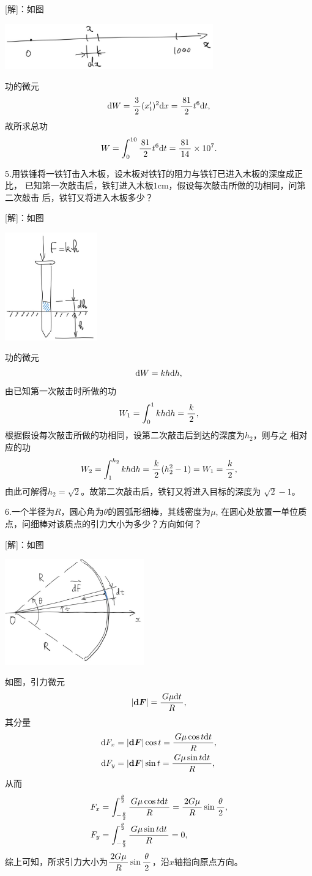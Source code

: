 [解]：如图
\begin{center}
	\includegraphics[width=9cm]{./images/ch6/moveSt.jpg}
\end{center}
功的微元
$$\d W=\df32(x'_t)^2\d x=\df{81}2t^6\d t,$$
故所求总功
$$W=\dint_0^{10}\df{81}2t^6\d t=\df{81}{14}\times10^7.$$
\fin

5.用铁锤将一铁钉击入木板，设木板对铁钉的阻力与铁钉已进入木板的深度成正比，
已知第一次敲击后，铁钉进入木板$1$cm，假设每次敲击所做的功相同，问第二次敲击
后，铁钉又将进入木板多少？

[解]：如图
\begin{center}
	\includegraphics[width=4cm]{./images/ch6/nailSt.jpg}
\end{center}
功的微元
$$\d W=kh\d h,$$
由已知第一次敲击时所做的功
$$W_1=\dint_0^1kh\d h=\df k2,$$
根据假设每次敲击所做的功相同，设第二次敲击后到达的深度为$h_2$，则与之
相对应的功
$$W_2=\dint_1^{h_2}kh\d h=\df k2(h^2_2-1)=W_1=\df k2,$$
由此可解得$h_2=\sqrt2$。故第二次敲击后，铁钉又将进入目标的深度为
$\sqrt2-1$。\fin

\bs

6.一个半径为$R$，圆心角为$\theta$的圆弧形细棒，其线密度为$\mu$,
在圆心处放置一单位质点，问细棒对该质点的引力大小为多少？方向如何？

[解]：如图
\begin{center}
	\includegraphics[width=6cm]{./images/ch6/theSphGr.jpg}
\end{center}
如图，引力微元
$$|\bm{\d F}|=\df{G\mu\d t}R,$$
其分量
\begin{align*}
	\d F_x&=|\bm{\d F}|\cos t=\df{G\mu\cos t\d t}R,\\
	\d F_y&=|\bm{\d F}|\sin t=\df{G\mu\sin t\d t}R,
\end{align*}
从而
\begin{align*}
	F_x&=\dint_{-\frac{\theta}2}^{\frac{\theta}2}\df{G\mu\cos t\d t}R
	=\df{2G\mu}{R}\sin\df{\theta}2,\\
	F_y&=\dint_{-\frac{\theta}2}^{\frac{\theta}2}\df{G\mu\sin t\d t}R=0,
\end{align*}
综上可知，所求引力大小为$\df{2G\mu}{R}\sin\df{\theta}2$，沿$x$轴指向原点方向。\fin